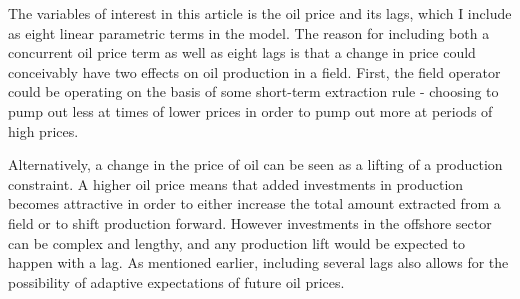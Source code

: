 \documentclass[12pt]{article}
\begin{document}
The variables of interest in this article is the oil price and its lags, which I include as eight linear parametric terms in the model.  The reason for including both a concurrent oil price term as well as eight lags is that a change in price could conceivably have two effects on oil production in a field.  First, the field operator could be operating on the basis of some short-term extraction rule - choosing to pump out less at times of lower prices in order to pump out more at periods of high prices.  

Alternatively, a change in the price of oil can be seen as a lifting of a production constraint.  A higher oil price means that added investments in production becomes attractive in order to either increase the total amount extracted from a field or to shift production forward.  However investments in the offshore sector can be complex and lengthy, and any production lift would be expected to happen with a lag.  As mentioned earlier, including several lags also allows for the possibility of adaptive expectations of future oil prices.  
\end{document}
